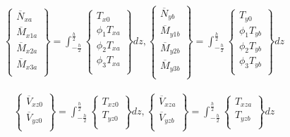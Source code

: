 \begin{equation}
\begin{matrix}
    \begin{Bmatrix}
            \overline{N}_{xa} \\
            \overline{M}_{x1a} \\
            \overline{M}_{x2a} \\
            \overline{M}_{x3a} \\
    \end{Bmatrix} = 
    \displaystyle\int_{-\frac{h}{2}}^{\frac{h}{2}}
    \begin{Bmatrix}
            T_{x0} \\
            \phi_1 T_{xa} \\
            \phi_2 T_{xa} \\
            \phi_3 T_{xa} \\
    \end{Bmatrix}
    dz,
    \begin{Bmatrix}
            \overline{N}_{yb} \\
            \overline{M}_{y1b} \\
            \overline{M}_{y2b} \\
            \overline{M}_{y3b} \\
    \end{Bmatrix} = 
    \displaystyle\int_{-\frac{h}{2}}^{\frac{h}{2}}
    \begin{Bmatrix}
            T_{y0} \\
            \phi_1 T_{yb} \\
            \phi_2 T_{yb} \\
            \phi_3 T_{yb} \\
    \end{Bmatrix}
    dz
\end{matrix}
\label{eq:bc_Bar_terms2}
\end{equation}

\begin{equation}
\begin{matrix}
    \begin{Bmatrix}
            \overline{V}_{xz0} \\
            \overline{V}_{yz0} \\
    \end{Bmatrix} = 
    \displaystyle\int_{-\frac{h}{2}}^{\frac{h}{2}}
    \begin{Bmatrix}
            T_{xz0} \\
            T_{yz0} \\
    \end{Bmatrix}
    dz,
    \begin{Bmatrix}
            \overline{V}_{xza} \\
            \overline{V}_{yzb} \\
    \end{Bmatrix} = 
    \displaystyle\int_{-\frac{h}{2}}^{\frac{h}{2}}
    \begin{Bmatrix}
            T_{xza} \\
            T_{yzb} \\
    \end{Bmatrix}
    dz
\end{matrix}
\label{eq:bc_Bar_terms3}
\end{equation}